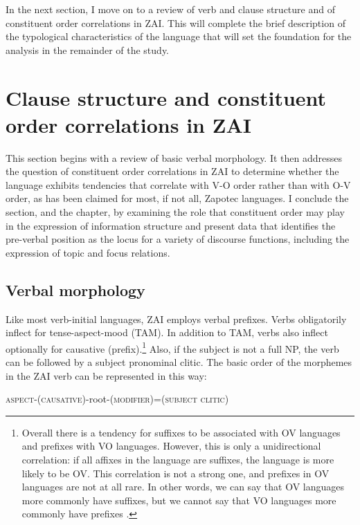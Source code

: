 In the next section, I move on to a review of verb and clause structure and of constituent order correlations in ZAI. This will complete the brief description of the typological characteristics of the language that will set the foundation for the analysis in the remainder of the study.


\section{Clause structure and constituent order correlations in ZAI}\label{wordorder}


This section begins with a review of basic verbal morphology. It then addresses the question of constituent order correlations in ZAI to determine whether the language exhibits tendencies that correlate with V-O order rather than with O-V order, as has been claimed for most, if not all, Zapotec languages. I conclude the section, and the chapter, by examining the role that constituent order may play in the expression of information structure and present data that identifies the pre-verbal position as the locus for a variety of discourse functions, including the expression of topic and focus relations. 



\subsection{Verbal morphology}\label{verbalmorphology}

Like most verb-initial languages, ZAI employs verbal prefixes. Verbs obligatorily inflect for tense-aspect-mood (TAM). In addition to TAM, verbs also inflect optionally for causative (prefix).\footnote{Overall there is a tendency for suffixes to be associated with OV languages and prefixes with VO languages. However, this is only a unidirectional correlation: if all affixes in the language are suffixes, the language is more likely to be OV. This correlation is not a strong one, and prefixes in OV languages are not at all rare. In other words, we can say that OV languages more commonly have suffixes, but we cannot say that VO languages more commonly have prefixes \citep{dryer2007}.} Also, if the subject is not a full NP, the verb can be followed by a subject pronominal clitic. The basic order of the morphemes in the ZAI verb can be represented in this way:


\vspace{3mm}
\textsc{aspect}-\textsc{(causative)}-root-\textsc{(modifier)}=\textsc{(subject clitic)}
\vspace{3mm}


